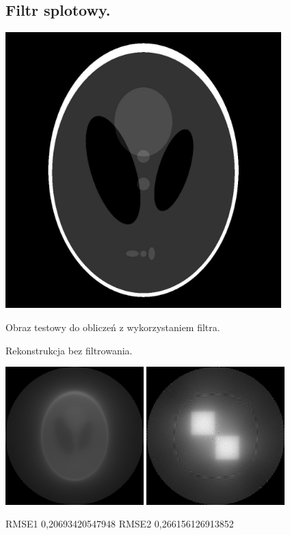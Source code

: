 \documentclass[paper=a4, fontsize=11pt]{scrartcl}
\begin{document}
	\subsection{Filtr splotowy.}
	\begin{center}
		\includegraphics[width=0.8\textwidth]{phantom.png}
		
		
		Obraz testowy do obliczeń z wykorzystaniem filtra.
	\end{center}

	\begin{center}
		Rekonstrukcja bez filtrowania.
		
		
		\includegraphics[width=0.4\textwidth]{reconstructed1.png}
		\includegraphics[width=0.4\textwidth]{reconstructed2.png}
		
		RMSE1 0,20693420547948 \hspace{1.5cm} RMSE2 0,266156126913852
		
	\end{center}
	
\end{document}
